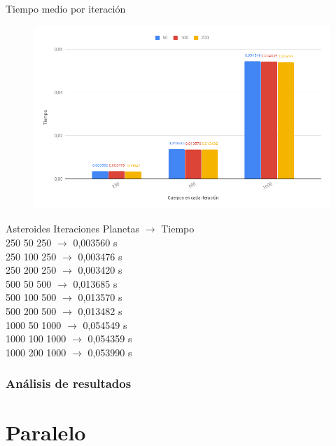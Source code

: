 \documentclass[12pt]{article}
\begin{document}
            \newpage
            Tiempo medio por iteración
            \begin{figure}[hbt!]
                \centering
                \includegraphics[width=\linewidth]{images/chart2.png}
            \end{figure}
        
            \begin{center}
                \noindent Asteroides Iteraciones Planetas $\rightarrow$ Tiempo \\
                250 50 250 $\rightarrow$ 0,003560 s \\
                250 100 250 $\rightarrow$ 0,003476 s \\
                250 200 250 $\rightarrow$ 0,003420 s \\
                500 50 500 $\rightarrow$ 0,013685 s \\
                500 100 500 $\rightarrow$ 0,013570 s \\
                500 200 500 $\rightarrow$ 0,013482 s \\
                1000 50 1000 $\rightarrow$ 0,054549 s \\
                1000 100 1000 $\rightarrow$ 0,054359 s \\
                1000 200 1000 $\rightarrow$ 0,053990 s \\
            \end{center}
        
        \newpage
        \subsubsection{Análisis de resultados}
    \newpage
    \section{Paralelo}
\end{document}
